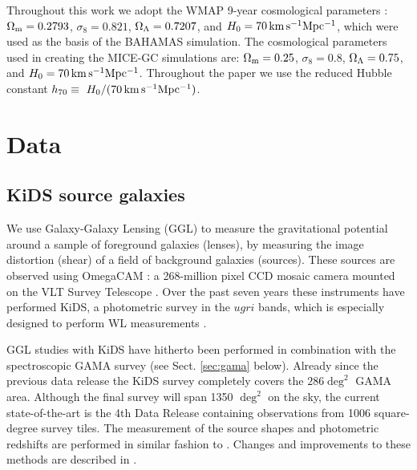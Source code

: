 \documentclass[usenatbib]{mnras}
\begin{document}
Throughout this work we adopt the WMAP 9-year \cite[]{hinshaw2013} cosmological parameters : $\Omega_{\rm m}=0.2793$, $\sigma_8=0.821$, $\Omega_{\rm \Lambda}=0.7207$, and $H_0 = 70 \, {\rm km \, s^{-1} Mpc^{-1}}$, which were used as the basis of the BAHAMAS simulation.
The cosmological parameters used in creating the MICE-GC simulations are: $\Omega_{\rm m}=0.25$, $\sigma_8=0.8$, $\Omega_{\rm \Lambda}=0.75$, and $H_0 = 70 \, {\rm km \, s^{-1} Mpc^{-1}}$.
Throughout the paper we use the reduced Hubble constant $h_{70} \equiv \ H_0 / (70 \, {\rm km \, s^{-1} Mpc^{-1}})$.

\section{Data}
\label{sec:data}

\subsection{KiDS source galaxies}
\label{sec:kids}

We use Galaxy-Galaxy Lensing (GGL) to measure the gravitational potential around a sample of foreground galaxies (lenses), by measuring the image distortion (shear) of a field of background galaxies (sources). These sources are observed using OmegaCAM \cite[]{kuijken2011}: a 268-million pixel CCD mosaic
camera mounted on the VLT Survey Telescope \cite[]{capaccioli2011}. Over the past seven years these instruments have performed KiDS, a photometric survey in the $ugri$ bands, which is especially designed to perform WL measurements \cite[]{dejong2013}.

GGL studies with KiDS have hitherto been performed in combination with the spectroscopic GAMA survey (see Sect. \ref{sec:gama} below). Already since the previous data release \cite[KiDS-DR3,][]{dejong2017} the KiDS survey completely covers the $286 \deg^2$ GAMA area. Although the final survey will span 1350 $\deg^2$ on the sky, the current state-of-the-art is the 4th Data Release \cite[KiDS-DR4,][]{kuijken2019} containing observations from 1006 square-degree survey tiles. The measurement of the source shapes and photometric redshifts are performed in similar fashion to \cite{dejong2017}. Changes and improvements to these methods are described in \cite{kuijken2019}. 
\end{document}

